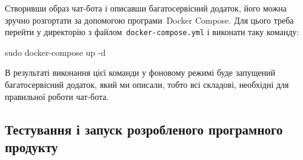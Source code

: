 \documentclass[
	a4paper,
	oneside,
	BCOR = 10mm,
	DIV = 12,
	12pt,
	headings = normal,
]{scrartcl}
\newcommand{\filename}[1]{\texttt{#1}}
\begin{document}
			Створивши образ чат-бота і описавши багатосервісний додаток, його можна зручно розгортати за допомогою програми~\textenglish{Docker Compose}. Для цього треба перейти у директорію з файлом~\filename{\textenglish{docker-compose.yml}} і виконати таку команду:
			\begin{bashterm}
				sudo docker-compose up -d
			\end{bashterm}
			В результаті виконання цієї команди у фоновому режимі буде запущений багатосервісний додаток, який ми описали, тобто всі складові, необхідні для правильної роботи чат-бота.

		\subsection{Тестування і запуск розробленого програмного продукту}

	\newpage
	\printbibliography
\end{document}

